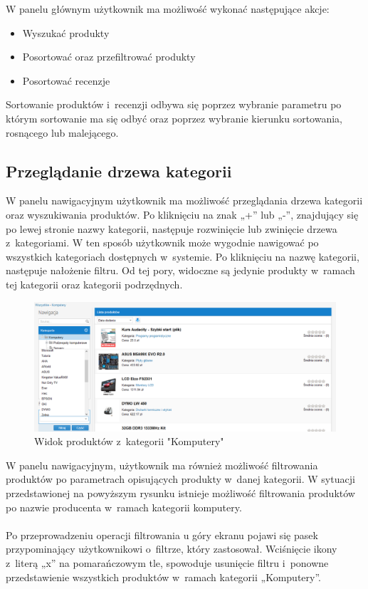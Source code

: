 W panelu głównym użytkownik ma możliwość wykonać następujące akcje:

\begin{itemize}
\item Wyszukać produkty
\item Posortować oraz przefiltrować produkty
\item Posortować recenzje
\end{itemize}

Sortowanie produktów i~recenzji odbywa się poprzez wybranie parametru po którym sortowanie ma się odbyć oraz poprzez wybranie kierunku sortowania, rosnącego lub malejącego.

\subsection{Przeglądanie drzewa kategorii}

W panelu nawigacyjnym użytkownik ma możliwość przeglądania drzewa kategorii oraz wyszukiwania produktów. Po kliknięciu na znak „+” lub „-”, znajdujący się po lewej stronie nazwy kategorii, następuje rozwinięcie lub zwinięcie drzewa z~kategoriami. W ten sposób użytkownik może wygodnie nawigować po wszystkich kategoriach dostępnych w~systemie. Po kliknięciu na nazwę kategorii, następuje nałożenie filtru. Od tej pory, widoczne są jedynie produkty w~ramach tej kategorii oraz kategorii podrzędnych.

\begin{figure}[h]
	\centering
	\includegraphics[width=1.00\textwidth]{images/filtr_kategorii.png}
	\caption{Widok produktów z~kategorii "Komputery"}
\end{figure}

W panelu nawigacyjnym, użytkownik ma również możliwość filtrowania produktów po parametrach opisujących produkty w~danej kategorii. W sytuacji przedstawionej na powyższym rysunku istnieje możliwość filtrowania produktów po nazwie producenta w~ramach kategorii komputery.
\paragraph{}
Po przeprowadzeniu operacji filtrowania u góry ekranu pojawi się pasek przypominający użytkownikowi o~filtrze, który zastosował. Wciśnięcie ikony z~literą „x” na pomarańczowym tle, spowoduje usunięcie filtru i~ponowne przedstawienie wszystkich produktów w~ramach kategorii „Komputery”.

